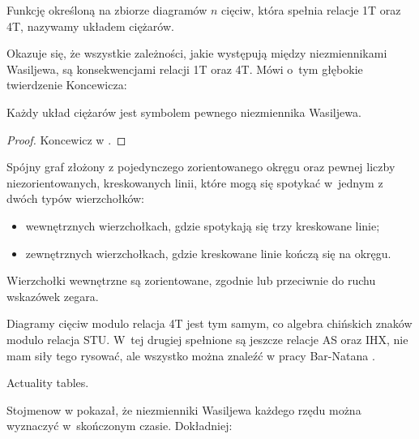 \begin{definition}
    Funkcję określoną na zbiorze diagramów $n$ cięciw, która spełnia relacje 1T oraz 4T, nazywamy układem ciężarów.
\end{definition}

Okazuje się, że wszystkie zależności, jakie występują między niezmiennikami Wasiljewa, są konsekwencjami relacji 1T oraz 4T.
Mówi o~tym głębokie twierdzenie Koncewicza:

\begin{proposition}
    Każdy układ ciężarów jest symbolem pewnego niezmiennika Wasiljewa. %
\end{proposition}

\begin{proof}
    Koncewicz w \cite{kontsevich93}. %
\end{proof}

\begin{definition}
    Spójny graf złożony z pojedynczego zorientowanego okręgu oraz pewnej liczby niezorientowanych, kreskowanych linii, które mogą się spotykać w~jednym z dwóch typów wierzchołków:
    \begin{itemize}
        \item wewnętrznych wierzchołkach, gdzie spotykają się trzy kreskowane linie;
        \item zewnętrznych wierzchołkach, gdzie kreskowane linie kończą się na okręgu.
    \end{itemize}
    Wierzchołki wewnętrzne są zorientowane, zgodnie lub przeciwnie do ruchu wskazówek zegara.
\end{definition}

Diagramy cięciw modulo relacja 4T jest tym samym, co algebra chińskich znaków modulo relacja STU.
%
W~tej drugiej spełnione są jeszcze relacje AS oraz IHX, nie mam siły tego rysować, ale wszystko można znaleźć w pracy Bar-Natana \cite{barnatan_95}.

\begin{tobedone}
    Actuality tables.
\end{tobedone}

Stojmenow w \cite{stoimenow_01} pokazał, że niezmienniki Wasiljewa każdego rzędu można wyznaczyć w~skończonym czasie.
Dokładniej:

